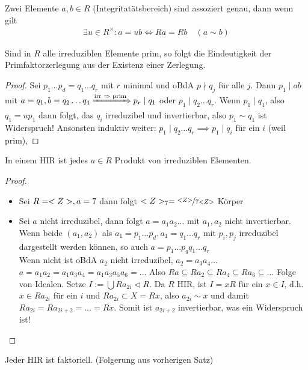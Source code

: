 \begin{definition}
	Zwei Elemente $a,b \in R$ (Integritatätsbereich) sind assoziert genau, dann wenn gilt
	\begin{align*}
		\exists u \in R^{\times}\colon a = ub \Leftrightarrow Ra = Rb \quad (a \sim b)
	\end{align*}
\end{definition}
\begin{lemma}
	Sind in $R$ alle irreduziblen Elemente prim, so folgt die Eindeutigkeit der Primfaktorzerlegung aus der Existenz einer Zerlegung.
\end{lemma}
\begin{proof}
	Sei $p_1 \dots p_d = q_1\dots q_r$ mit $r$ minimal und oBdA $p \nmid q_j$ für alle $j$. Dann $p_1 \mid ab$ mit $a = q_1,b=q_2\dots q_4 \xRightarrow{\text{irr $\implies$ prim}} p_r \mid q_1$ oder $p_1 \mid q_2 \dots q_r$. Wenn $p_1 \mid q_1$, also $q_1 = u p_1$ dann folgt, das $q_i$ irreduzibel und invertierbar, also $p_1 \sim q_1$ ist Widerspruch! Ansonsten induktiv weiter: $p_1\mid q_2 \dots q_r \implies p_1 \mid q_i$ für ein $i$ (weil prim),
\end{proof}
\begin{lemma}
	In einem HIR ist jedes $a \in R$ Produkt von irreduziblen Elementen.
\end{lemma}
\begin{proof}
	\begin{itemize}
		\item Sei $R = \Z, a = 7$ dann folgt $\Z_7 = \lnkset{\Z}{7\Z}$ Körper
		\item Sei $a$ nicht irreduzibel, dann folgt $a = a_1 a_2 \dots$ mit $a_1, a_2$ nicht invertierbar. Wenn beide $(a_1,a_2)$ als $a_1=p_1\dots p_d, a_1 = q_1\dots q_r$ mit $p_i, p_j$ irreduzibel dargestellt werden können, so auch $a = p_1 \dots p_q q_1 \dots q_r$ \checkmark\\
		Wenn nicht ist oBdA $a_2$ nicht irreduzibel, $a_2 = a_3 a_4 \dots$\\
		$a = a_1 a_2 = a_1 a_3 a_4 = a_1 a_3 a_5 a_6  = \dots $ Also $Ra \subseteq Ra_2 \subseteq Ra_4 \subseteq Ra_6 \subseteq \dots$ Folge von Idealen. Setze $I := \bigcup Ra_{2i} \lhd R$. Da $R$ HIR, ist $I = xR$ für ein $x \in I$, d.h. $x \in Ra_{2i}$ für ein $i$ und $Ra_{2i} \subset X = Rx$, also $a_{2i} \sim x$ und damit $Ra_{2i} = Ra_{2i + 2} = \dots = Rx$. Somit ist $a_{2i + 2}$ invertierbar, was ein Widerspruch ist!
	\end{itemize}
\end{proof}
\begin{conclusion}
	Jeder HIR ist faktoriell. (Folgerung aus vorherigen Satz)
\end{conclusion}
